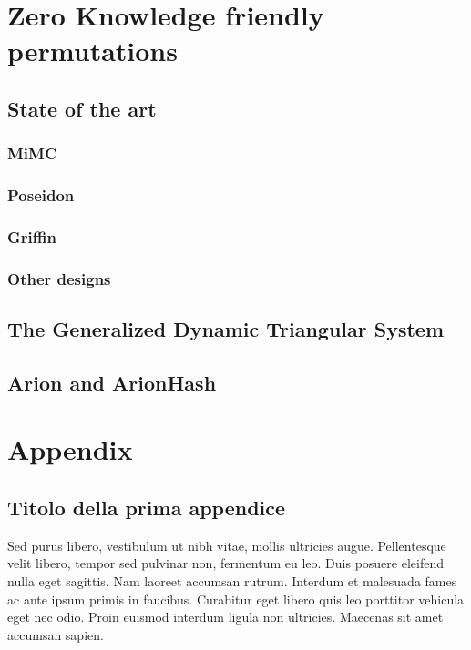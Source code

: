\documentclass[target=mst]{thud}
\theoremstyle{definition}
\theoremstyle{plain}
\theoremstyle{remark}
\begin{document}



\part{Zero Knowledge friendly permutations}\label{part:zk-hash}
\chapter{State of the art}
\section{MiMC}
\section{Poseidon}
\section{Griffin}
\section{Other designs}
\chapter{The Generalized Dynamic Triangular System}
\chapter{Arion and ArionHash}



\appendix

\part{Appendix}

\chapter{Titolo della prima appendice}
Sed purus libero, vestibulum ut nibh vitae, mollis ultricies augue. Pellentesque velit libero, tempor sed
pulvinar non, fermentum eu leo. Duis posuere eleifend nulla eget sagittis. Nam laoreet accumsan rutrum.
Interdum et malesuada fames ac ante ipsum primis in faucibus. Curabitur eget libero quis leo porttitor
vehicula eget nec odio. Proin euismod interdum ligula non ultricies. Maecenas sit amet accumsan sapien.
\end{document}
